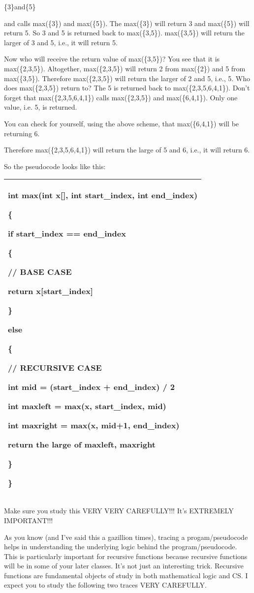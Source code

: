 \documentclass[
]{article}
\begin{document}
\{3\}and\{5\}

and calls max(\{3\}) and max(\{5\}). The max(\{3\}) will return 3 and
max(\{5\}) will return 5. So 3 and 5 is returned back to max(\{3,5\}).
max(\{3,5\}) will return the larger of 3 and 5, i.e., it will return 5.

Now who will receive the return value of max(\{3,5\})? You see that it
is max(\{2,3,5\}). Altogether, max(\{2,3,5\}) will return 2 from
max(\{2\}) and 5 from max(\{3,5\}). Therefore max(\{2,3,5\}) will return
the larger of 2 and 5, i.e., 5. Who does max(\{2,3,5\}) return to? The 5
is returned back to max(\{2,3,5,6,4,1\}). Don't forget that
max(\{2,3,5,6,4,1\}) calls max(\{2,3,5\}) and max(\{6,4,1\}). Only one
value, i.e. 5, is returned.

You can check for yourself, using the above scheme, that max(\{6,4,1\})
will be returning 6.

Therefore max(\{2,3,5,6,4,1\}) will return the large of 5 and 6, i.e.,
it will return 6.

So the pseudocode looks like this:

\begin{longtable}[]{@{}l@{}}
\toprule
\endhead
\begin{minipage}[t]{0.97\columnwidth}\raggedright
int max(int x{[}{]}, int start\_index, int end\_index)

\{

if start\_index == end\_index

\{

// BASE CASE

return x{[}start\_index{]}

\}

else

\{

// RECURSIVE CASE

int mid = (start\_index + end\_index) / 2

int maxleft = max(x, start\_index, mid)

int maxright = max(x, mid+1, end\_index)

return the large of maxleft, maxright

\}

\}\strut
\end{minipage}\tabularnewline
\bottomrule
\end{longtable}

Make sure you study this VERY VERY CAREFULLY!!! It's EXTREMELY
IMPORTANT!!!

As you know (and I've said this a gazillion times), tracing a
progam/pseudocode helps in understanding the underlying logic behind the
program/pseudocode. This is particularly important for recursive
functions because recursive functions will be in some of your later
classes. It's not just an interesting trick. Recursive functions are
fundamental objects of study in both mathematical logic and CS. I expect
you to study the following two traces VERY CAREFULLY.
\end{document}
